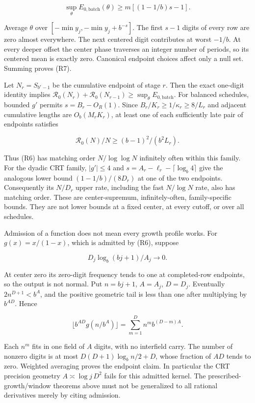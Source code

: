 \documentclass[11pt,a4paper]{article}
\begin{document}
\[
\sup_\theta E_{0,\mathrm{batch}}(\theta)
 \ge m[(1-1/b)s-1].
\tag{R7}
\]

Average \(\theta\) over \([-\min y_j,-\min y_j+b^{-s}]\). The first
\(s-1\) digits of every row are zero almost everywhere. The next
centered digit contributes at worst \(-1/b\). At every deeper offset the
center phase traverses an integer number of periods, so its centered
mean is exactly zero. Canonical endpoint choices affect only a null set.
Summing proves (R7).

Let \(N_r=S_{b^r-1}\) be the cumulative endpoint of stage \(r\). Then
the exact one-digit identity implies
\(\mathcal R_0(N_r)+\mathcal R_0(N_{r-1})\ge\sup_\theta E_{0,\mathrm{batch}}\).
For balanced schedules, bounded \(g'\) permits \(s=B_r-O_R(1)\). Since
\(B_r/K_r\ge1/\kappa_r\ge8/L_r\) and adjacent cumulative lengths are
\(O_b(M_rK_r)\), at least one of each sufficiently late pair of
endpoints satisfies

\[
\mathcal R_0(N)/N\ge (b-1)^2/(b^2L_r).
\]

Thus (R6) has matching order \(N/\log\log N\) infinitely often within
this family. For the dyadic CRT family, \(|g'|\le4\) and
\(s=A_r-\ell_r-\lceil\log_b4\rceil\) give the analogous lower bound
\((1-1/b)/(8D_r)\) at one of the two endpoints. Consequently its
\(N/D_r\) upper rate, including the fast \(N/\log N\) rate, also has
matching order. These are center-supremum, infinitely-often,
family-specific bounds. They are not lower bounds at a fixed center, at
every cutoff, or over all schedules.

Admission of a function does not mean every growth profile works. For
\(g(x)=x/(1-x)\), which is admitted by (R6), suppose

\[
D_j\log_b(bj+1)/A_j\to0.
\tag{R8}
\]

At center zero its zero-digit frequency tends to one at completed-row
endpoints, so the output is not normal. Put \(n=bj+1\), \(A=A_j\),
\(D=D_j\). Eventually \(2n^{D+1}< b^A\), and the positive geometric tail
is less than one after multiplying by \(b^{AD}\). Hence

\[
\lfloor b^{AD}g(n/b^A)\rfloor
       =\sum_{m=1}^D n^m b^{(D-m)A}.
\]

Each \(n^m\) fits in one field of \(A\) digits, with no interfield
carry. The number of nonzero digits is at most \(D(D+1)\log_b n/2+D\),
whose fraction of \(AD\) tends to zero. Weighted averaging proves the
endpoint claim. In particular the CRT precision geometry
\(A\asymp\log j\,D^2\) fails for this admitted kernel. The
prescribed-growth/window theorems above must not be generalized to all
rational derivatives merely by citing admission.
\end{document}
